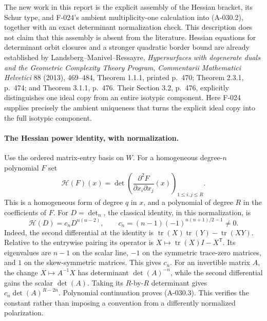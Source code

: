The new work in this report is the explicit assembly of the Hessian
bracket, its Schur type, and F-024's ambient multiplicity-one
calculation into (A-030.2), together with an exact determinant
normalization check. This description does not claim that this
assembly is absent from the literature. Hessian equations for
determinant orbit closures and a stronger quadratic border bound
are already established by Landsberg--Manivel--Ressayre,
\emph{Hypersurfaces with degenerate duals and the Geometric
Complexity Theory Program},
\emph{Commentarii Mathematici Helvetici} 88 (2013), 469--484,
Theorem 1.1.1, printed p.~470; Theorem 2.3.1, p.~474;
and Theorem 3.1.1, p.~476. Their Section 3.2, p.~476,
explicitly distinguishes one ideal copy from an entire isotypic
component. Here F-024 supplies precisely the ambient uniqueness
that turns the explicit ideal copy into the full isotypic component.

\paragraph{The Hessian power identity, with normalization.}
Use the ordered matrix-entry basis on \(W\). For a homogeneous
degree-\(n\) polynomial \(F\) set
\[
 \mathcal H(F)(x)=\det\!\left(
           \frac{\partial^2 F}{\partial x_i\partial x_j}(x)
                         \right)_{1\leq i,j\leq R}.
\]
This is a homogeneous form of degree \(q\) in \(x\), and a
polynomial of degree \(R\) in the coefficients of \(F\).
For \(D=\det_n\), the classical identity, in this normalization, is
\[
 \mathcal H(D)=c_nD^{n(n-2)},\qquad
 c_n=(n-1)(-1)^{n(n+1)/2-1}\ne0.                     \tag{A-030.3}
\]
Indeed, the second differential at the identity is
\(\operatorname{tr}(X)\operatorname{tr}(Y)-\operatorname{tr}(XY)\).
Relative to the entrywise pairing its operator is
\(X\mapsto\operatorname{tr}(X)I-X^{\mathsf T}\).
Its eigenvalues are \(n-1\) on the scalar line, \(-1\) on the
symmetric trace-zero matrices, and \(1\) on the skew-symmetric
matrices. This gives \(c_n\). For an invertible matrix \(A\),
the change \(X\mapsto A^{-1}X\) has determinant
\(\det(A)^{-n}\), while the second differential gains the scalar
\(\det(A)\). Taking its \(R\)-by-\(R\) determinant gives
\(c_n\det(A)^{R-2n}\). Polynomial continuation proves (A-030.3).
This verifies the constant rather than imposing a convention from
a differently normalized polarization.

